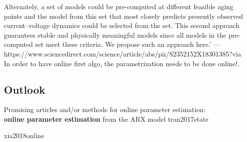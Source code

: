 Alternately, a set of models could be pre-computed at different feasible aging points and the model from this set that most closely predicts presently observed current–voltage dynamics could be selected from the set. This second approach guarantees stable and physically meaningful models since all models in the pre-computed set meet these criteria. We propose such an approach here.' 
---https://www.sciencedirect.com/science/article/abs/pii/S2352152X18301385?via%
In order to have online first algo, the parametrization needs to be done online!. 



\subsection{Outlook} 

Promising articles and/or methods for online parameter estimation: \\ 

\textbf{online parameter estimation} from the ARX model {tran2017state}

\cite{wang2021augmented}
{xia2018online}
